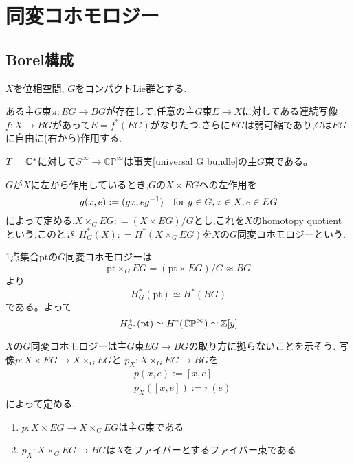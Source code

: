 \section{同変コホモロジー}
\subsection{Borel構成}

$X$を位相空間, $G$をコンパクトLie群とする.

\begin{fact}\label{universal G bundle}
  ある主$G$束$\pi\colon EG\rightarrow BG$が存在して,任意の主$G$束$E\rightarrow X$に対してある連続写像$f\colon X\rightarrow BG$があって$E=f^*(EG)$がなりたつ.さらに$EG$は弱可縮であり,$G$は$EG$に自由に(右から)作用する.
\end{fact}

\begin{eg}
  $T=\mathbb{C}^*$に対して$S^\infty\rightarrow \mathbb{CP}^\infty$は事実\ref{universal G bundle}の主$G$束である。
\end{eg}

\begin{defin}
  $G$が$X$に左から作用しているとき,$G$の$X\times EG$への左作用を
  \[
  g(x, e) := (gx, eg^{-1}) \quad \text{for } g\in G, x\in X, e\in EG 
  \]
  によって定める.$X\times_GEG\colon=(X\times EG)/G$とし,これを$X$のhomotopy quotient という.このとき
  $H^*_G(X)\colon=H^*(X\times_GEG)$を$X$の$G$同変コホモロジーという.
\end{defin}

\begin{eg}
  1点集合$\text{pt}$の$G$同変コホモロジーは
  \[
  \text{pt}\times_GEG=(\text{pt}\times EG)/G\approx BG
  \]
  より
  \[
  H^*_G(\text{pt})\simeq H^*(BG)
  \]
  である。よって
  \[
  H^*_{\mathbb{C}^*}(\text{pt})\simeq H^*(\mathbb{CP}^\infty)\simeq \mathbb{Z}[y]
  \]
\end{eg}


$X$の$G$同変コホモロジーは主$G$束$EG\rightarrow BG$の取り方に拠らないことを示そう.
写像$p\colon X\times EG\rightarrow X\times_GEG$と $p_X\colon X\times_GEG\rightarrow BG$を
\begin{align*}
  &p(x, e):=[x,e]\\
  &p_X([x,e]):=\pi(e)
\end{align*}
によって定める.

\begin{prop}
  \:
  \begin{enumerate}
    \item $p\colon X\times EG\rightarrow X\times_GEG$は主$G$束である
    \item $p_X\colon X\times_GEG\rightarrow BG$は$X$をファイバーとするファイバー束である
  \end{enumerate}
\end{prop}

